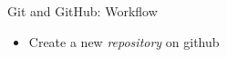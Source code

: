
\begin{frame}{Git and GitHub: Workflow}
%
\begin{itemize}
\item Create a new \emph{repository} on github
\end{itemize}
%
\end{frame}